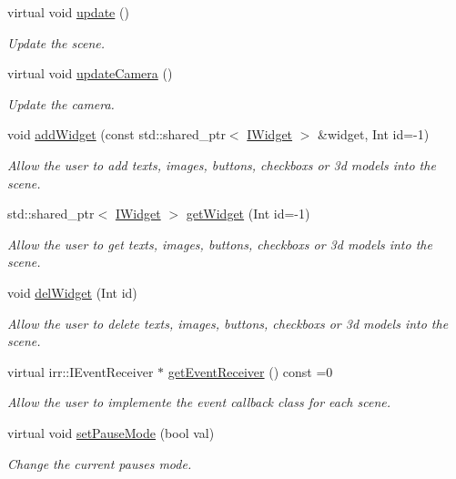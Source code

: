 \begin{DoxyCompactItemize}
\mbox{\label{classAScene_a5f13212b503601ef58b8387b36c5796c}} 
virtual void \hyperlink{classAScene_a5f13212b503601ef58b8387b36c5796c}{update} ()
\begin{DoxyCompactList}\small\item\em Update the scene. \end{DoxyCompactList}\item 
\mbox{\label{classAScene_a3d7821a7bff4304027e22b27bebf4088}} 
virtual void \hyperlink{classAScene_a3d7821a7bff4304027e22b27bebf4088}{update\+Camera} ()
\begin{DoxyCompactList}\small\item\em Update the camera. \end{DoxyCompactList}\item 
void \hyperlink{classAScene_aa711b6068dd8dee262160eedfd96ad02}{add\+Widget} (const std\+::shared\+\_\+ptr$<$ \hyperlink{classIWidget}{I\+Widget} $>$ \&widget, Int id=-\/1)
\begin{DoxyCompactList}\small\item\em Allow the user to add texts, images, buttons, checkboxs or 3d models into the scene. \end{DoxyCompactList}\item 
std\+::shared\+\_\+ptr$<$ \hyperlink{classIWidget}{I\+Widget} $>$ \hyperlink{classAScene_a04796ae4f8cfdf49f7e3295c29fc97cc}{get\+Widget} (Int id=-\/1)
\begin{DoxyCompactList}\small\item\em Allow the user to get texts, images, buttons, checkboxs or 3d models into the scene. \end{DoxyCompactList}\item 
void \hyperlink{classAScene_ad2b0ac8cd74a8523c76b681a34b5f5b4}{del\+Widget} (Int id)
\begin{DoxyCompactList}\small\item\em Allow the user to delete texts, images, buttons, checkboxs or 3d models into the scene. \end{DoxyCompactList}\item 
virtual irr\+::\+I\+Event\+Receiver $\ast$ \hyperlink{classAScene_af521e5e6d30a5d2e5d30eb333e4d3abd}{get\+Event\+Receiver} () const =0
\begin{DoxyCompactList}\small\item\em Allow the user to implemente the event callback class for each scene. \end{DoxyCompactList}\item 
virtual void \hyperlink{classAScene_a7ff45d7a24796f52d815c00770900339}{set\+Pause\+Mode} (bool val)
\begin{DoxyCompactList}\small\item\em Change the current pause\textquotesingle{}s mode. \end{DoxyCompactList}\end{DoxyCompactItemize}


